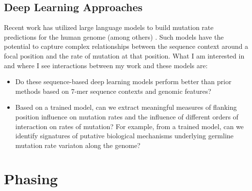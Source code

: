 \subsection{Deep Learning Approaches}

Recent work has utilized large language models to build mutation rate predictions for the human genome (among others) \citep{Fang2022}. Such models have the potential to capture complex relationships between the sequence context around a focal position and the rate of mutation at that position. What I am interested in and where I see interactions between my work and these models are:

\begin{itemize}
    \item Do these sequence-based deep learning models perform better than prior methods based on 7-mer sequence contexts and genomic features?
    \item Based on a trained model, can we extract meaningful measures of flanking position influence on mutation rates and the influence of different orders of interaction on rates of mutation? For example, from a trained model, can we identify signatures of putative biological mechanisms underlying germline mutation rate variaton along the genome?
\end{itemize}

\section{Phasing}

